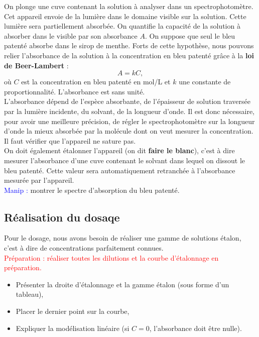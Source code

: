 \documentclass[11pt,a4paper]{report}
\begin{document}
On plonge une cuve contenant la solution à analyser dans un spectrophotomètre. Cet appareil envoie de la lumière dans le domaine visible sur la solution. Cette lumière sera partiellement absorbée. On quantifie la capacité de la solution à absorber dans le visible par son absorbance $A$. On suppose que seul le bleu patenté absorbe dans le sirop de menthe. Forts de cette hypothèse, nous pouvons relier l'absorbance de la solution à la concentration en bleu patenté grâce à la \textbf{loi de Beer-Lambert} :
\begin{equation}
	A = k C,
\end{equation}
où $C$ est la concentration en bleu patenté en mol/L et $k$ une constante de proportionnalité. L'absorbance est sans unité.\\

L'absorbance dépend de l'espèce absorbante, de l'épaisseur de solution traversée par la lumière incidente, du solvant, de la longueur d'onde. Il est donc nécessaire, pour avoir une meilleure précision, de régler le spectrophotomètre sur la longueur d'onde la mieux absorbée par la molécule dont on veut mesurer la concentration. Il faut vérifier que l'appareil ne sature pas.\\

On doit également étalonner l'appareil (on dit \textbf{faire le blanc}), c'est à dire mesurer l'absorbance d'une cuve contenant le solvant dans lequel on dissout le bleu patenté. Cette valeur sera automatiquement retranchée à l'absorbance mesurée par l'appareil.\\

\textcolor{blue}{Manip :} montrer le spectre d'absorption du bleu patenté.

\subsection{Réalisation du dosaqe}

Pour le dosage, nous avons besoin de réaliser une gamme de solutions étalon, c'est à dire de concentrations parfaitement connues.\\
\textcolor{red}{Préparation : réaliser toutes les dilutions et la courbe d'étalonnage en préparation.}\\

\begin{itemize}
	\item Présenter la droite d'étalonnage et la gamme étalon (sous forme d'un tableau),
	\item Placer le dernier point sur la courbe,
	\item Expliquer la modélisation linéaire (si $C = 0$, l'absorbance doit être nulle).\\
\end{itemize}  
\end{document}
